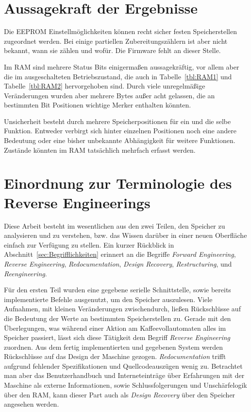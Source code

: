 \section{Aussagekraft der Ergebnisse}\label{sec:AussagekraftDerErgebnisse}
Die \ac{EEPROM} Einstellmöglichkeiten können recht sicher festen Speicherstellen zugeordnet werden.
Bei einige partiellen Zubereitungszählern ist aber nicht bekannt, wann sie zählen und wofür.
Die Firmware fehlt an dieser Stelle.

Im \ac{RAM} sind mehrere Status Bits einigermaßen aussagekräftig, vor allem aber die im ausgeschalteten Betriebszustand, die auch in Tabelle~\ref{tbl:RAM1} und Tabelle~\ref{tbl:RAM2} hervorgehoben sind.
Durch viele unregelmäßige Veränderungen wurden aber mehrere Bytes außer acht gelassen, die an bestimmten Bit Positionen wichtige Merker enthalten könnten.

Unsicherheit besteht durch mehrere Speicherpositionen für ein und die selbe Funktion.
Entweder verbirgt sich hinter einzelnen Positionen noch eine andere Bedeutung oder eine bisher unbekannte Abhängigkeit für weitere Funktionen.
Zustände könnten im \ac{RAM} tatsächlich mehrfach erfasst werden.

\section{Einordnung zur Terminologie des Reverse Engineerings}\label{sec:DiskussionBegriffReverseEngineering}
Diese Arbeit besteht im wesentlichen aus den zwei Teilen, den Speicher zu analysieren und zu verstehen, bzw. das Wissen darüber in einer neuen Oberfläche einfach zur Verfügung zu stellen.
Ein kurzer Rückblick in Abschnitt~\ref{sec:Begrifflichkeiten} erinnert an die Begriffe \textit{Forward Engineering}, \textit{Reverse Engineering}, \textit{Redocumentation}, \textit{Design Recovery}, \textit{Restructuring}, und \textit{Reengineering}.

Für den ersten Teil wurden eine gegebene serielle Schnittstelle, sowie bereits implementierte Befehle ausgenutzt, um den Speicher auszulesen.
Viele Aufnahmen, mit kleinen Veränderungen zwischendurch, ließen Rückschlüsse auf die Bedeutung der Werte an bestimmten Speicherstellen zu.
Gerade mit den Überlegungen, was während einer Aktion am Kaffeevollautomaten alles im Speicher passiert, lässt sich diese Tätigkeit dem Begriff \textit{Reverse Engineering} zuordnen.
Aus dem fertig implementierten und gegebenen System werden Rückschlüsse auf das Design der Maschine gezogen.
\textit{Redocumentation} trifft aufgrund fehlender Spezifikationen und Quellcodeauszügen wenig zu.
Betrachtet man aber das Benutzerhandbuch und Interneteinträge über Erfahrungen mit der Maschine als externe Informationen, sowie Schlussfolgerungen und Unschärfelogik über den \ac{RAM}, kann dieser Part auch als \textit{Design Recovery} über den Speicher angesehen werden.

